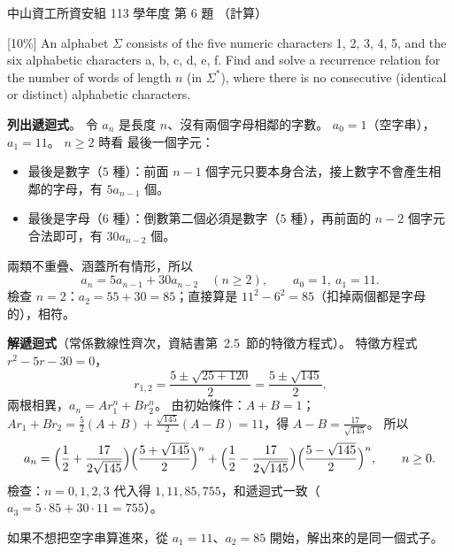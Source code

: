 \begin{pastexam}[label={px:nsysu-113-dmalg-06}]{中山資工所資安組 113 學年度 第 6 題}
（計算）

{[10\%]} An alphabet $\Sigma$ consists of the five numeric characters 1, 2, 3, 4, 5, and the six alphabetic
characters a, b, c, d, e, f. Find and solve a recurrence relation for the number of words of length $n$ (in
$\Sigma^*$), where there is no consecutive (identical or distinct) alphabetic characters.
\end{pastexam}

\begin{pastsoln}
\textbf{列出遞迴式}。 令 $a_n$ 是長度 $n$、沒有兩個字母相鄰的字數。 $a_0 = 1$（空字串），$a_1 = 11$。 $n \ge 2$ 時看
最後一個字元：
\begin{itemize}
\item 最後是數字（$5$ 種）：前面 $n - 1$ 個字元只要本身合法，接上數字不會產生相鄰的字母，有 $5 a_{n-1}$ 個。
\item 最後是字母（$6$ 種）：倒數第二個必須是數字（$5$ 種），再前面的 $n - 2$ 個字元合法即可，有 $30 a_{n-2}$ 個。
\end{itemize}
兩類不重疊、涵蓋所有情形，所以
\[
a_n = 5 a_{n-1} + 30 a_{n-2} \quad (n \ge 2), \qquad a_0 = 1,\ a_1 = 11 .
\]
檢查 $n = 2$：$a_2 = 55 + 30 = 85$；直接算是 $11^2 - 6^2 = 85$（扣掉兩個都是字母的），相符。

\textbf{解遞迴式}（常係數線性齊次，資結書第~2.5~節的特徵方程式）。 特徵方程式 $r^2 - 5r - 30 = 0$，
\[
r_{1,2} = \frac{5 \pm \sqrt{25 + 120}}{2} = \frac{5 \pm \sqrt{145}}{2} .
\]
兩根相異，$a_n = A r_1^n + B r_2^n$。 由初始條件：$A + B = 1$；
$A r_1 + B r_2 = \frac{5}{2}(A + B) + \frac{\sqrt{145}}{2}(A - B) = 11$，得 $A - B = \frac{17}{\sqrt{145}}$。 所以
\[
a_n = \Bigl(\frac{1}{2} + \frac{17}{2\sqrt{145}}\Bigr)\Bigl(\frac{5 + \sqrt{145}}{2}\Bigr)^n
+ \Bigl(\frac{1}{2} - \frac{17}{2\sqrt{145}}\Bigr)\Bigl(\frac{5 - \sqrt{145}}{2}\Bigr)^n ,
\qquad n \ge 0 .
\]
檢查：$n = 0, 1, 2, 3$ 代入得 $1, 11, 85, 755$，和遞迴式一致（$a_3 = 5 \cdot 85 + 30 \cdot 11 = 755$）。

如果不想把空字串算進來，從 $a_1 = 11$、$a_2 = 85$ 開始，解出來的是同一個式子。
\end{pastsoln}
